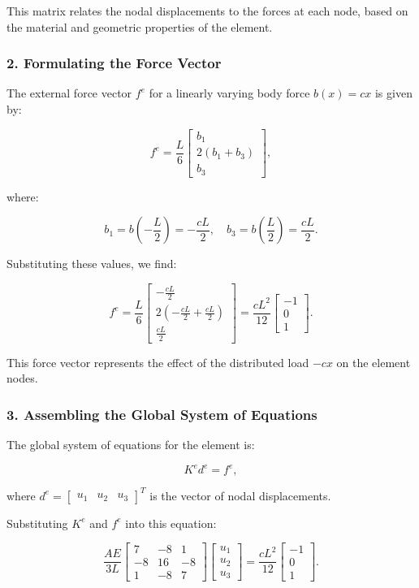\documentclass{article}
\begin{document}
This matrix relates the nodal displacements to the forces at each node, based on the material and geometric properties of the element.

\subsubsection*{2. Formulating the Force Vector}

The external force vector \( f^e \) for a linearly varying body force \( b(x) = cx \) is given by:

\[
f^e = \frac{L}{6} \begin{bmatrix} b_1 \\ 2(b_1 + b_3) \\ b_3 \end{bmatrix},
\]

where:

\[
b_1 = b\left(-\frac{L}{2}\right) = -\frac{cL}{2}, \quad b_3 = b\left(\frac{L}{2}\right) = \frac{cL}{2}.
\]

Substituting these values, we find:

\[
f^e = \frac{L}{6} \begin{bmatrix} -\frac{cL}{2} \\ 2\left(-\frac{cL}{2} + \frac{cL}{2}\right) \\ \frac{cL}{2} \end{bmatrix} = \frac{cL^2}{12} \begin{bmatrix} -1 \\ 0 \\ 1 \end{bmatrix}.
\]

This force vector represents the effect of the distributed load \( -cx \) on the element nodes.

\subsubsection*{3. Assembling the Global System of Equations}

The global system of equations for the element is:

\[
K^e d^e = f^e,
\]

where \( d^e = \begin{bmatrix} u_1 & u_2 & u_3 \end{bmatrix}^T \) is the vector of nodal displacements.

Substituting \( K^e \) and \( f^e \) into this equation:

\[
\frac{AE}{3L} \begin{bmatrix} 7 & -8 & 1 \\ -8 & 16 & -8 \\ 1 & -8 & 7 \end{bmatrix} \begin{bmatrix} u_1 \\ u_2 \\ u_3 \end{bmatrix} = \frac{cL^2}{12} \begin{bmatrix} -1 \\ 0 \\ 1 \end{bmatrix}.
\]
\end{document}
